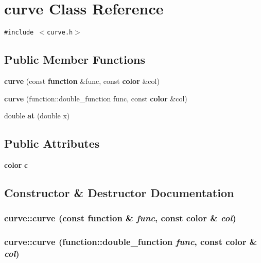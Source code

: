 \section{curve Class Reference}
\label{classcurve}
{\tt \#include $<$curve.h$>$}

\subsection*{Public Member Functions}
\begin{CompactItemize}
\item 
{\bf curve} (const {\bf function} \&func, const {\bf color} \&col)
\item 
{\bf curve} (function::double\_\-function func, const {\bf color} \&col)
\item 
double {\bf at} (double x)
\end{CompactItemize}
\subsection*{Public Attributes}
\begin{CompactItemize}
\item 
{\bf color} {\bf c}
\end{CompactItemize}


\subsection{Constructor \& Destructor Documentation}
\subsubsection[{curve}]{\setlength{\rightskip}{0pt plus 5cm}curve::curve (const {\bf function} \& {\em func}, \/  const {\bf color} \& {\em col})\hspace{0.3cm}{\tt  [inline]}}\label{classcurve_3baee656f6bec3c9d6bb819ba807f9df}


\subsubsection[{curve}]{\setlength{\rightskip}{0pt plus 5cm}curve::curve (function::double\_\-function {\em func}, \/  const {\bf color} \& {\em col})\hspace{0.3cm}{\tt  [inline]}}\label{classcurve_7d220a3f9bda5cb0936416e4a4dcb4a2}




